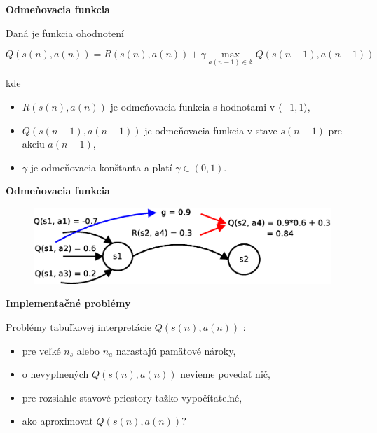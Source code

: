 \documentclass[xcolor=dvipsnames]{beamer}
\begin{document}
\begin{frame}{\bf Odmeňovacia funkcia}

Daná je funkcia ohodnotení

\begin{equation}
Q(s(n),a(n)) = R(s(n),a(n)) + \gamma \max_{a(n-1) \in \mathbb{A}} Q(s(n-1), a(n-1)) \nonumber
\end{equation}

kde \\

\begin{itemize}
 \item $R(s(n),a(n))$ je odmeňovacia funkcia s hodnotami v $\langle -1, 1 \rangle$, \\
 \item $Q(s(n-1),a(n-1))$ je odmeňovacia funkcia v stave $s(n-1)$ pre akciu $a(n-1)$, \\
 \item $\gamma$ je odmeňovacia konštanta a platí $\gamma \in (0, 1)$.
\end{itemize}

\end{frame}


\begin{frame}{\bf Odmeňovacia funkcia}

\begin{figure}[!htb]
\includegraphics[scale=.4]{../diagrams/q_learning_detail.eps}
\end{figure}


\end{frame}



\begin{frame}{\bf Implementačné problémy}

Problémy tabuľkovej interpretácie $Q(s(n), a(n))$ :

\begin{itemize}
\item pre veľké ${n_s}$  alebo  ${n_a}$ narastajú pamäťové nároky,
\item o nevyplnených $Q(s(n), a(n))$ nevieme povedať nič,
\item pre rozsiahle stavové priestory ťažko vypočítateľné,
\item ako aproximovať $Q(s(n), a(n))$?
\end{itemize}

\end{frame}
\end{document}

